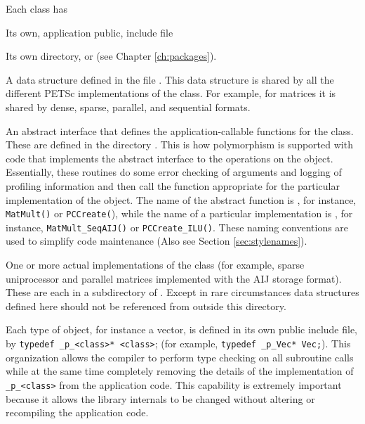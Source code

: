 Each class has
\begin{tightitemize}
\item Its own, application public, include file 
\item Its own directory,  or  (see Chapter \ref{ch:packages}).
\item A data structure defined in  the file
      .
      This data structure is shared by all the different PETSc implementations of the
      class. For example, for matrices it is shared by dense,
      sparse, parallel, and sequential formats.
\item An abstract interface that defines the application-callable
      functions for the class. These are defined in the directory
      . This is how polymorphism is supported with code that implements the abstract interface to the
operations on the object.  Essentially, these routines do some error
checking of arguments and logging of profiling information
and then call the function appropriate for the
particular implementation of the object. The name of the abstract
    function is , for instance, \lstinline{MatMult()} or \lstinline{PCCreate(}), while
the name of a particular implementation is
, for instance,
\lstinline{MatMult_SeqAIJ()} or \lstinline{PCCreate_ILU()}. These naming
    conventions are used to simplify code maintenance (Also see Section \ref{sec:stylenames}).

\item One or more actual implementations of the class (for example,
      sparse uniprocessor and parallel matrices implemented with the AIJ storage format).
      These are each in a subdirectory of
      . Except in rare circumstances data
      structures defined here should not be referenced from outside this
      directory.
\end{tightitemize}

Each type of object, for instance a vector, is defined in its own
public include file, by \lstinline{typedef _p_<class>* <class>}; (for example, \lstinline{typedef _p_Vec* Vec;}).
  This organization allows the compiler to perform type checking on all subroutine calls
while at the same time
completely removing the details of the implementation of \lstinline{_p_<class>} from the application code.  This capability is extremely important
because it allows the library internals to be changed
without altering or recompiling the application code.

